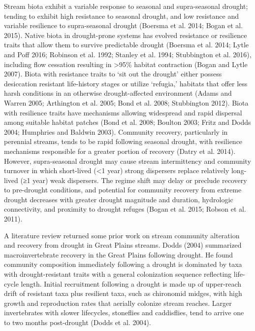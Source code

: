 \documentclass[12pt,twoside]{reedthesis}
\theoremstyle{definition}
\theoremstyle{definition}
\theoremstyle{definition}
\theoremstyle{remark}
\begin{document}
Stream biota exhibit a variable response to seasonal and supra-seasonal
drought; tending to exhibit high resistance to seasonal drought, and low
resistance and variable resilience to supra-seasonal drought (Boersma et
al. 2014; Bogan et al. 2015). Native biota in drought-prone systems has
evolved resistance or resilience traits that allow them to survive
predictable drought (Boersma et al. 2014; Lytle and Poff 2016; Robinson
et al. 1992; Stanley et al. 1994; Stubbington et al. 2016), including
flow cessation resulting in \textgreater{}95\% habitat contraction
(Bogan and Lytle 2007). Biota with resistance traits to `sit out the
drought' either possess desiccation resistant life-history stages or
utilize `refugia,' habitats that offer less harsh conditions in an
otherwise drought-affected environment (Adams and Warren 2005;
Arthington et al. 2005; Bond et al. 2008; Stubbington 2012). Biota with
resilience traits have mechanisms allowing widespread and rapid
dispersal among suitable habitat patches (Bond et al. 2008; Boulton
2003; Fritz and Dodds 2004; Humphries and Baldwin 2003). Community
recovery, particularly in perennial streams, tends to be rapid following
seasonal drought, with resilience mechanisms responsible for a greater
portion of recovery (Datry et al. 2014). However, supra-seasonal drought
may cause stream intermittency and community turnover in which
short-lived (\textless{}1 year) strong dispersers replace relatively
long-lived (≥1 year) weak dispersers. The regime shift may delay or
preclude recovery to pre-drought conditions, and potential for community
recovery from extreme drought decreases with greater drought magnitude
and duration, hydrologic connectivity, and proximity to drought refuges
(Bogan et al. 2015; Robson et al. 2011).

A literature review returned some prior work on stream community
alteration and recovery from drought in Great Plains streams. Dodds
(2004) summarized macroinvertebrate recovery in the Great Plains
following drought. He found community composition immediately following
a drought is dominated by taxa with drought-resistant traits with a
general colonization sequence reflecting life-cycle length. Initial
recruitment following a drought is made up of upper-reach drift of
resistant taxa plus resilient taxa, such as chironomid midges, with high
growth and reproduction rates that aerially colonize stream reaches.
Larger invertebrates with slower lifecycles, stoneflies and caddisflies,
tend to arrive one to two months post-drought (Dodds et al. 2004).
\end{document}
